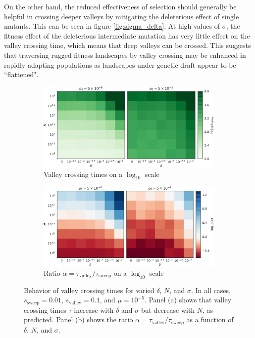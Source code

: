 \documentclass[rmp]{revtex4}
\begin{document}
\begin{spacing}{1.5}
On the other hand, the reduced effectiveness of selection should generally be helpful in crossing deeper valleys by mitigating the deleterious effect of single mutants.
This can be seen in figure \ref{fig:sigma_delta}.
At high values of $\sigma$, the fitness effect of the deleterious intermediate mutation has very little effect on the valley crossing time, which means that deep valleys can be crossed.
This suggests that traversing rugged fitness landscapes by valley crossing may be enhanced in rapidly adapting populations as landscapes under genetic draft appear to be ``flattened".

\begin{figure}[t]
\begin{subfigure}[b]{0.475\textwidth}
  \includegraphics[width=\textwidth]{Figures/tau_compare_crop.pdf}
  \caption{Valley crossing times on a $\log_{10}$ scale}
  \label{fig:tau}
\end{subfigure}
\begin{subfigure}[b]{0.475\textwidth}
  \includegraphics[width=\textwidth]{Figures/alpha_ratios_crop.pdf}
  \caption{Ratio $\alpha = \tau_{\mathrm{valley}}/\tau_{\mathrm{sweep}}$ on a $\log_{10}$ scale}
  \label{fig:ratios}
\end{subfigure}
\caption{Behavior of valley crossing times for varied $\delta$, $N$, and $\sigma$. In all cases, $s_{\mathrm{sweep}} = 0.01$, $s_{\mathrm{valley}} = 0.1$, and $\mu = 10^{-5}$. Panel (a) shows that valley crossing times $\tau$ increase with $\delta$ and $\sigma$ but decrease with $N$, as predicted. Panel (b) shows the ratio $\alpha = \tau_{\mathrm{valley}}/\tau_{\mathrm{sweep}}$ as a function of $\delta$, $N$, and $\sigma$.}
\label{fig:tau-ratios}
\end{figure}


\end{spacing}
\end{document}
